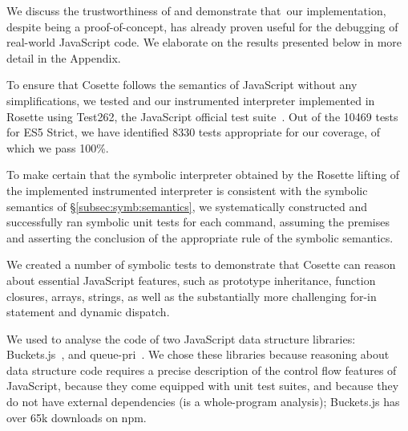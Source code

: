 
We discuss the trustworthiness of \cosette and demonstrate that~our implementation, despite being  a proof-of-concept, has already proven useful for the debugging of real-world JavaScript code.
We elaborate on the results presented below in more detail in the Appendix. 

To ensure that Cosette follows the semantics of JavaScript without any simplifications, we tested \JSComp and our instrumented \jsil interpreter implemented in Rosette using Test262, the JavaScript official test suite~\cite{test262}. 
Out of the 10469 tests for ES5 Strict, we have identified 8330 tests appropriate for our coverage, of which we pass 100\%.

 To make certain that the symbolic \jsil interpreter obtained by the Rosette lifting of the implemented instrumented interpreter is consistent with the symbolic semantics of \S\ref{subsec:symb:semantics}, we systematically constructed and successfully ran symbolic unit tests for each \jsil command, assuming the premises and asserting the conclusion of the appropriate rule of the symbolic semantics.


We created a number of symbolic tests to demonstrate that Cosette can reason about essential JavaScript features, such as prototype inheritance, function closures, arrays, strings, as well as the substantially more challenging for-in statement and dynamic dispatch. 

We used \cosette to analyse the code of two JavaScript data structure libraries: Buckets.js~\cite{buckets}, and queue-pri~\cite{priq}.
We chose these libraries because reasoning about data structure code requires a precise description of the control flow features of JavaScript, because they come equipped with unit test suites, and because they do not have external dependencies (\cosette is a whole-program analysis); Buckets.js has over 65k downloads on npm.

